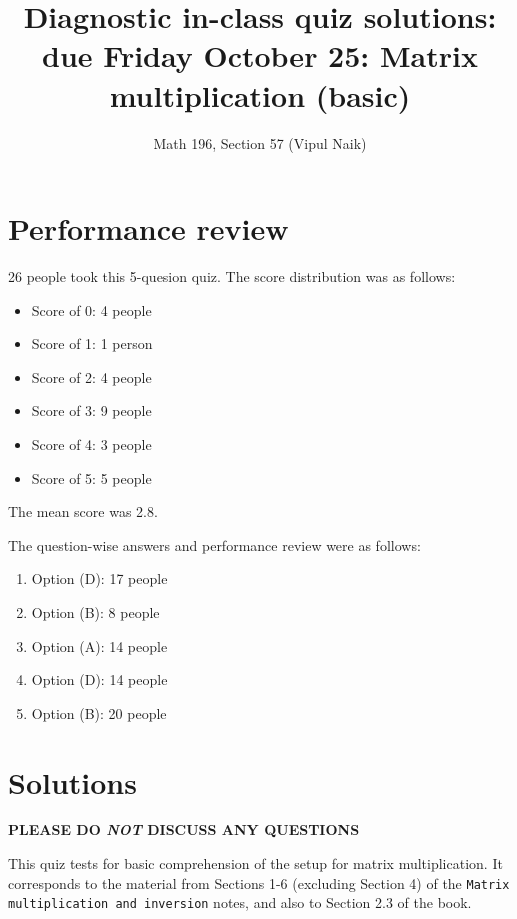 \documentclass[10pt]{amsart}
\title{Diagnostic in-class quiz solutions: due Friday October 25: Matrix multiplication (basic)}
\author{Math 196, Section 57 (Vipul Naik)}
\begin{document}
\maketitle

\section{Performance review}

26 people took this 5-quesion quiz. The score distribution was as follows:

\begin{itemize}
\item Score of 0: 4 people
\item Score of 1: 1 person
\item Score of 2: 4 people
\item Score of 3: 9 people
\item Score of 4: 3 people
\item Score of 5: 5 people
\end{itemize}

The mean score was 2.8.

The question-wise answers and performance review were as follows:

\begin{enumerate}
\item Option (D): 17 people
\item Option (B): 8 people
\item Option (A): 14 people
\item Option (D): 14 people
\item Option (B): 20 people
\end{enumerate}

\section{Solutions}

{\bf PLEASE DO {\em NOT} DISCUSS ANY QUESTIONS}

This quiz tests for basic comprehension of the setup for matrix
multiplication. It corresponds to the material from Sections 1-6
(excluding Section 4) of the {\tt Matrix multiplication and inversion}
notes, and also to Section 2.3 of the book.
\end{document}
